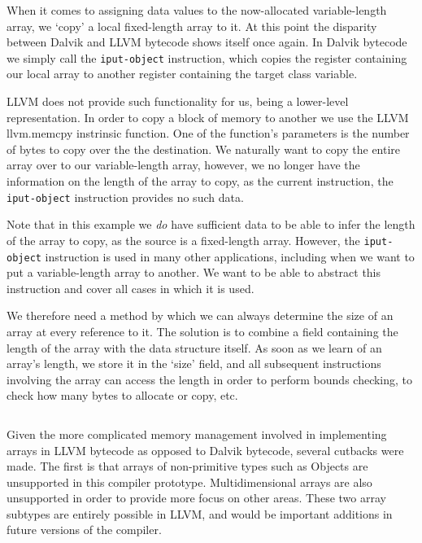 \newpage

\begin{lstlisting}[frame=single, caption={LLVM pointer array}, label=lst:llvm_ptr]
%a = i32*
\end{lstlisting}

When it comes to assigning data values to the now-allocated variable-length array, we `copy' a local fixed-length array to it. At this point the disparity between Dalvik and LLVM bytecode shows itself once again. In Dalvik bytecode we simply call the \verb|iput-object| instruction, which copies the register containing our local array to another register containing the target class variable.

LLVM does not provide such functionality for us, being a lower-level representation. In order to copy a block of memory to another we use the LLVM llvm.memcpy instrinsic function. One of the function's parameters is the number of bytes to copy over the the destination. We naturally want to copy the entire array over to our variable-length array, however, we no longer have the information on the length of the array to copy, as the current instruction, the \verb|iput-object| instruction provides no such data.

Note that in this example we \textit{do} have sufficient data to be able to infer the length of the array to copy, as the source is a fixed-length array. However, the \verb|iput-object| instruction is used in many other applications, including when we want to put a variable-length array to another. We want to be able to abstract this instruction and cover all cases in which it is used.


We therefore need a method by which we can always determine the size of an array at every reference to it. The solution is to combine a field containing the length of the array with the data structure itself. As soon as we learn of an array's length, we store it in the `size' field, and all subsequent instructions involving the array can access the length in order to perform bounds checking, to check how many bytes to allocate or copy, etc.

\lstset{
	language=Assembly,
	basicstyle=\small,
	stringstyle=\ttfamily
}
\begin{lstlisting}[frame=single]
%struct_array = { i32, i32* }
\end{lstlisting}

Given the more complicated memory management involved in implementing arrays in LLVM bytecode as opposed to Dalvik bytecode, several cutbacks were made. The first is that arrays of non-primitive types such as Objects are unsupported in this compiler prototype. Multidimensional arrays are also unsupported in order to provide more focus on other areas. These two array subtypes are entirely possible in LLVM, and would be important additions in future versions of the compiler.
